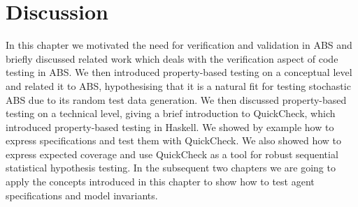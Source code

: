 

\section{Discussion}
In this chapter we motivated the need for verification and validation in ABS and briefly discussed related work which deals with the verification aspect of code testing in ABS. We then introduced property-based testing on a conceptual level and related it to ABS, hypothesising that it is a natural fit for testing stochastic ABS due to its random test data generation. We then discussed property-based testing on a technical level, giving a brief introduction to QuickCheck, which introduced property-based testing in Haskell. We showed by example how to express specifications and test them with QuickCheck. We also showed how to express expected coverage and use QuickCheck as a tool for robust sequential statistical hypothesis testing. In the subsequent two chapters we are going to apply the concepts introduced in this chapter to show how to test agent specifications and model invariants. 
